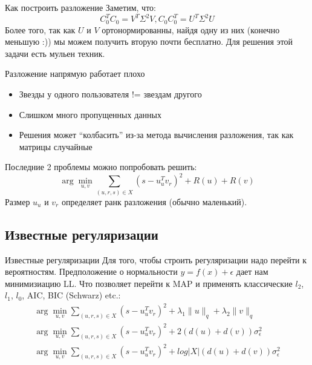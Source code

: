 \documentclass[14pt, fleqn, xcolor={dvipsnames, table}]{beamer}
\begin{document}
\begin{frame}{Как построить разложение}
Заметим, что:
$$
C_0^T C_0 = V^T \Sigma^2 V, C_0 C_0^T = U^T \Sigma^2 U
$$
Более того, так как $U$ и $V$ ортонормированны, найдя одну из них (конечно меньшую :)) мы можем получить вторую почти бесплатно. Для решения этой задачи есть мульен техник.
\end{frame}

\begin{frame}{Разложение напрямую работает плохо}
\begin{itemize}
  \item Звезды у одного пользователя != звездам другого
  \item Слишком много пропущенных данных
  \item Решения может ``колбасить'' из-за метода вычисления разложения, так как матрицы случайные
\end{itemize}
Последние 2 проблемы можно попробовать решить:
$$
\arg \min_{u,v} \sum_{(u,r,s) \in X} (s - u_u^T v_r)^2 + R(u) + R(v)
$$
Размер $u_u$ и $v_r$ определяет ранк разложения (обычно маленький).
\end{frame}

\subsection{Известные регуляризации} %
\begin{frame}{Известные регуляризации}
\small
Для того, чтобы строить регуляризации надо перейти к вероятностям. Предположение о нормальности $y = f(x) + \epsilon$ дает нам минимизиацию LL. Что позволяет перейти к MAP и применять классические $l_2$, $l_1$, $l_0$, AIC, BIC (Schwarz) etc.:
$$\begin{array}{c}
\arg \min_{u,v} \sum_{(u,r,s) \in X} (s - u_u^T v_r)^2 + \lambda_1 \|u\|_q + \lambda_2 \|v\|_q \\
\arg \min_{u,v} \sum_{(u,r,s) \in X} (s - u_u^T v_r)^2 + 2 \left(d(u) + d(v)\right) \sigma^2_\epsilon \\
\arg \min_{u,v} \sum_{(u,r,s) \in X} (s - u_u^T v_r)^2 + log |X| \left(d(u) + d(v)\right) \sigma^2_\epsilon\\
\end{array}$$
\end{frame}
\end{document}
